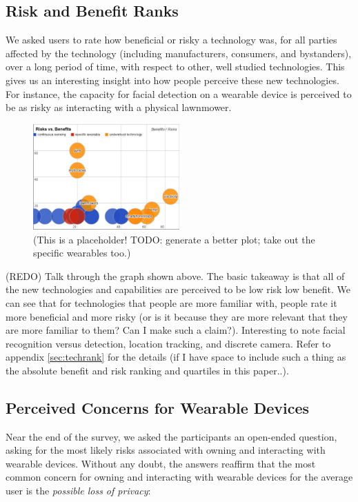 \documentclass{acm_proc_article-sp}
\begin{document}
\subsection{Risk and Benefit Ranks} 

We asked users to rate how beneficial or risky a technology was, for all parties affected by the technology (including manufacturers, consumers, and bystanders), over a long period of time, with respect to other, well studied technologies. This gives us an interesting insight into how people perceive these new technologies. For instance, the capacity for facial detection on a wearable device is perceived to be as risky as interacting with a physical lawnmower. 

\begin{figure}
	\centering
	\includegraphics[width=0.5\textwidth]{techplot.png}
	\caption{(This is a placeholder! TODO: generate a better plot; take out the specific wearables too.)}
\end{figure}

(REDO) Talk through the graph shown above. The basic takeaway is that all of the new technologies and capabilities are perceived to be low risk low benefit. We can see that for technologies that people are more familiar with, people rate it more beneficial and more risky (or is it because they are more relevant that they are more familiar to them? Can I make such a claim?). Interesting to note facial recognition versus detection, location tracking, and discrete camera. Refer to appendix \ref{sec:techrank} for the details (if I have space to include such a thing as the absolute benefit and risk ranking and quartiles in this paper..). 

\subsection{Perceived Concerns for Wearable Devices}
Near the end of the survey, we asked the participants an open-ended question, asking for the most likely risks associated with owning and interacting with wearable devices. Without any doubt, the answers reaffirm that the most common concern for owning and interacting with wearable devices for the average user is the \textit{possible loss of privacy}:
\end{document}
